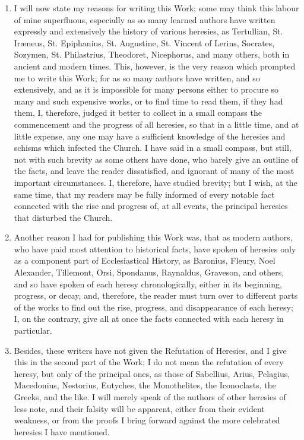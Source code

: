 \documentclass[12pt]{book}
\begin{document}
\begin{enumerate}
\item I will now state my reasons for writing this Work; some may think this labour of mine superfluous,
especially as so many learned authors have written expressly and extensively the history of various
heresies, as Tertullian, St. Iræneus, St. Epiphanius, St. Augustine, St. Vincent of Lerins, Socrates,
Sozymen, St. Philastrius, Theodoret, Nicephorus, and many others, both in ancient and modern times.
This, however, is the very reason which prompted me to write this Work; for as so many authors have
written, and so extensively, and as it is impossible for many persons either to procure so many and such 
expensive works, or to find time to read them, if they had them, I, therefore, judged it better to collect in a
small compass the commencement and the progress of all heresies, so that in a little time, and at little
expense, any one may have a sufficient knowledge of the heresies and schisms which infected the
Church. I have said in a small compass, but still, not with such brevity as some others have done, who
barely give an outline of the facts, and leave the reader dissatisfied, and ignorant of many of the most
important circumstances. I, therefore, have studied brevity; but I wish, at the same time, that my readers
may be fully informed of every notable fact connected with the rise and progress of, at all events, the
principal heresies that disturbed the Church.

\item Another reason I had for publishing this Work was, that as modern authors, who have paid most
attention to historical facts, have spoken of heresies only as a component part of Ecclesiastical History, as
Baronius, Fleury, Noel Alexander, Tillemont, Orsi, Spondanus, Raynaldus, Graveson, and others, and so
have spoken of each heresy chronologically, either in its beginning, progress, or decay, and, therefore, the
reader must turn over to different parts of the works to find out the rise, progress, and disappearance of
each heresy; I, on the contrary, give all at once the facts connected with each heresy in particular.

\item Besides, these writers have not given the Refutation of Heresies, and I give this in the second part of
the Work; I do not mean the refutation of every heresy, but only of the principal ones, as those of
Sabellius, Arius, Pelagius, Macedonius, Nestorius, Eutyches, the Monothelites, the Iconoclasts, the
Greeks, and the like. I will merely speak of the authors of other heresies of less note, and their falsity will
be apparent, either from their evident weakness, or from the proofs I bring forward against the more
celebrated heresies I have mentioned.


\end{enumerate}
\end{document}
